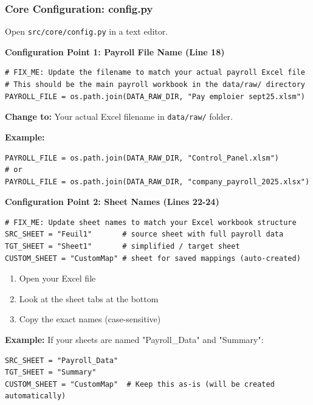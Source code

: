 \documentclass[11pt,a4paper]{article}
\begin{document}
\subsubsection{Core Configuration: config.py}

Open \texttt{src/core/config.py} in a text editor.

\textbf{Configuration Point 1: Payroll File Name (Line 18)}

\begin{lstlisting}[style=pythonstyle, caption=Update Payroll File Name]
# FIX_ME: Update the filename to match your actual payroll Excel file
# This should be the main payroll workbook in the data/raw/ directory
PAYROLL_FILE = os.path.join(DATA_RAW_DIR, "Pay emploier sept25.xlsm")
\end{lstlisting}

\textbf{Change to:} Your actual Excel filename in \texttt{data/raw/} folder.

\textbf{Example:}
\begin{lstlisting}[style=pythonstyle]
PAYROLL_FILE = os.path.join(DATA_RAW_DIR, "Control_Panel.xlsm")
# or
PAYROLL_FILE = os.path.join(DATA_RAW_DIR, "company_payroll_2025.xlsx")
\end{lstlisting}

\textbf{Configuration Point 2: Sheet Names (Lines 22-24)}

\begin{lstlisting}[style=pythonstyle, caption=Update Sheet Names]
# FIX_ME: Update sheet names to match your Excel workbook structure
SRC_SHEET = "Feuil1"       # source sheet with full payroll data
TGT_SHEET = "Sheet1"       # simplified / target sheet
CUSTOM_SHEET = "CustomMap" # sheet for saved mappings (auto-created)
\end{lstlisting}

\begin{infobox}[title=How to Find Sheet Names]
\begin{enumerate}
    \item Open your Excel file
    \item Look at the sheet tabs at the bottom
    \item Copy the exact names (case-sensitive)
\end{enumerate}
\end{infobox}

\textbf{Example:} If your sheets are named "Payroll\_Data" and "Summary":
\begin{lstlisting}[style=pythonstyle]
SRC_SHEET = "Payroll_Data"
TGT_SHEET = "Summary"
CUSTOM_SHEET = "CustomMap"  # Keep this as-is (will be created automatically)
\end{lstlisting}
\end{document}
